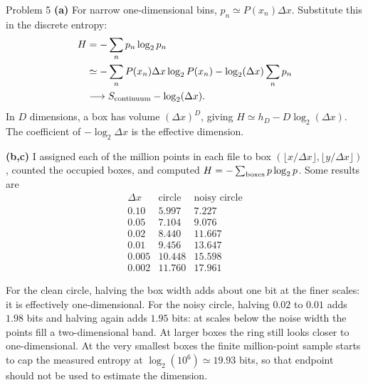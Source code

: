 \documentclass[12pt,a4paper]{article}
\begin{document}
\begin{solution}{Problem 5}
\textbf{(a)} For narrow one-dimensional bins,
$p_n\simeq P(x_n)\Delta x$. Substitute this in the discrete entropy:
\begin{align*}
 H&=-\sum_n p_n\log_2p_n\\
 &\simeq-\sum_n P(x_n)\Delta x\log_2P(x_n)
        -\log_2(\Delta x)\sum_n p_n\\
 &\longrightarrow S_{\rm continuum}-\log_2(\Delta x).
\end{align*}
In $D$ dimensions, a box has volume $(\Delta x)^D$, giving
$\boxed{H\simeq h_D-D\log_2(\Delta x)}$. The coefficient of
$-\log_2\Delta x$ is the effective dimension.

\textbf{(b,c)} I assigned each of the million points in each file to box
$(\lfloor x/\Delta x\rfloor,\lfloor y/\Delta x\rfloor)$, counted the occupied
boxes, and computed $H=-\sum_{\rm boxes}p\log_2p$. Some results are
\[
\begin{array}{c|rr}
\Delta x&\text{circle}&\text{noisy circle}\\\hline
0.10&5.997&7.227\\
0.05&7.104&9.076\\
0.02&8.440&11.667\\
0.01&9.456&13.647\\
0.005&10.448&15.598\\
0.002&11.760&17.961
\end{array}
\]
\begin{center}
\end{center}
For the clean circle, halving the box width adds about one bit at the finer
scales: it is effectively one-dimensional. For the noisy circle, halving
$0.02$ to $0.01$ adds $1.98$ bits and halving again adds $1.95$ bits:
at scales below the noise width the points fill a two-dimensional band.
At larger boxes the ring still looks closer to one-dimensional. At the
very smallest boxes the finite million-point sample starts to cap the
measured entropy at $\log_2(10^6)\simeq19.93$ bits, so that endpoint should
not be used to estimate the dimension.
\end{solution}
\end{document}
